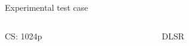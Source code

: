 \documentclass[10pt,aspectratio=169,dvipsnames]{beamer} %
\begin{document}
\begin{frame}{Experimental test case}
\begin{columns}[T]
\begin{column}[t]{.25\textwidth}
\begin{block}{CS: 1024p}
\begin{figure}
				\end{figure}
			\end{block}				
		\end{column}
		\begin{column}[t]{.25\textwidth}
			\begin{alertblock}{DLSR}
				\begin{figure}
					\centering
					\vfill			

\end{figure}
\end{alertblock}
\end{column}
\end{columns}
\end{frame}
\end{document}

